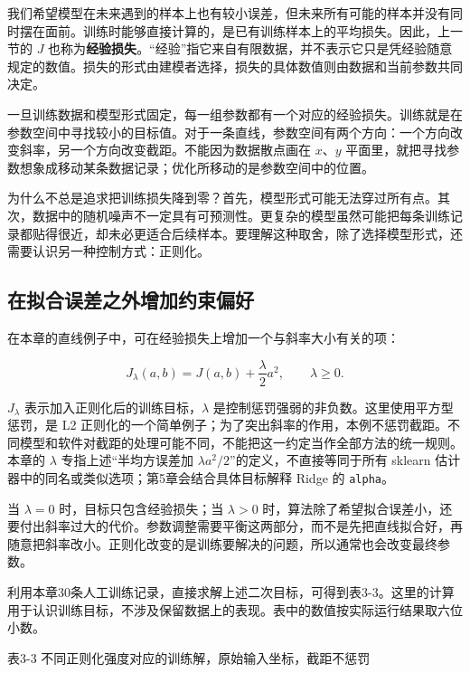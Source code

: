 我们希望模型在未来遇到的样本上也有较小误差，但未来所有可能的样本并没有同时摆在面前。训练时能够直接计算的，是已有训练样本上的平均损失。因此，上一节的 \(J\) 也称为\textbf{经验损失}。``经验''指它来自有限数据，并不表示它只是凭经验随意规定的数值。损失的形式由建模者选择，损失的具体数值则由数据和当前参数共同决定。

一旦训练数据和模型形式固定，每一组参数都有一个对应的经验损失。训练就是在参数空间中寻找较小的目标值。对于一条直线，参数空间有两个方向：一个方向改变斜率，另一个方向改变截距。不能因为数据散点画在 \(x\)、\(y\) 平面里，就把寻找参数想象成移动某条数据记录；优化所移动的是参数空间中的位置。

为什么不总是追求把训练损失降到零？首先，模型形式可能无法穿过所有点。其次，数据中的随机噪声不一定具有可预测性。更复杂的模型虽然可能把每条训练记录都贴得很近，却未必更适合后续样本。要理解这种取舍，除了选择模型形式，还需要认识另一种控制方式：正则化。

\subsection{在拟合误差之外增加约束偏好}

在本章的直线例子中，可在经验损失上增加一个与斜率大小有关的项：

\[J_{\lambda}(a,b) = J(a,b) + \frac{\lambda}{2}a^{2},\quad\quad\lambda \geq 0.\]

\(J_{\lambda}\) 表示加入正则化后的训练目标，\(\lambda\) 是控制惩罚强弱的非负数。这里使用平方型惩罚，是 L2 正则化的一个简单例子；为了突出斜率的作用，本例不惩罚截距。不同模型和软件对截距的处理可能不同，不能把这一约定当作全部方法的统一规则。本章的 \(\lambda\) 专指上述``半均方误差加 \(\lambda a^{2}/2\)''的定义，不直接等同于所有 sklearn 估计器中的同名或类似选项；第5章会结合具体目标解释 Ridge 的 \texttt{alpha}。

当 \(\lambda = 0\) 时，目标只包含经验损失；当 \(\lambda > 0\) 时，算法除了希望拟合误差小，还要付出斜率过大的代价。参数调整需要平衡这两部分，而不是先把直线拟合好，再随意把斜率改小。正则化改变的是训练要解决的问题，所以通常也会改变最终参数。

利用本章30条人工训练记录，直接求解上述二次目标，可得到表3-3。这里的计算用于认识训练目标，不涉及保留数据上的表现。表中的数值按实际运行结果取六位小数。

表3-3 不同正则化强度对应的训练解，原始输入坐标，截距不惩罚

